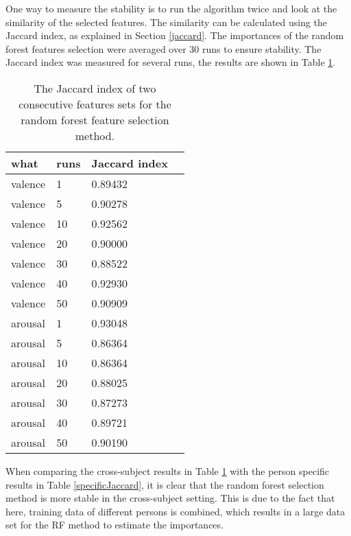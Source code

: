 \npar

One way to measure the stability is to run the algorithm twice and look at the similarity of the selected features. The similarity can be calculated using the Jaccard index, as explained in Section \ref{jaccard}. The importances of the random forest features selection were averaged over 30 runs to ensure stability. The Jaccard index was measured for several runs, the results are shown in Table \ref{Jaccard_gen}.

\begin{table}[H]
\centering
\caption{The Jaccard index of two consecutive features sets for the random forest feature selection method. \label{Jaccard_gen}}
\begin{tabular}{l|l|ll}
\textbf{what} & \textbf{runs} & \textbf{Jaccard index}    \\ \hline
valence       & 1             & 0.89432                   \\
valence       & 5             & 0.90278                   \\
valence       & 10            & 0.92562                   \\
valence       & 20            & 0.90000                   \\
valence       & 30            & 0.88522                   \\
valence       & 40            & 0.92930                   \\
valence       & 50            & 0.90909                   \\ \hline
arousal       & 1             & 0.93048                   \\
arousal       & 5             & 0.86364                   \\
arousal       & 10            & 0.86364                   \\
arousal       & 20            & 0.88025                   \\
arousal       & 30            & 0.87273                   \\
arousal       & 40            & 0.89721                   \\
arousal       & 50            & 0.90190                  
\end{tabular}
\end{table}

When comparing the cross-subject results in Table \ref{Jaccard_gen} with the person specific results in Table \ref{specificJaccard}, it is clear that the random forest selection method is more stable in the cross-subject setting. This is due to the fact that here, training data of different persons is combined, which results in a large data set for the RF method to estimate the importances.